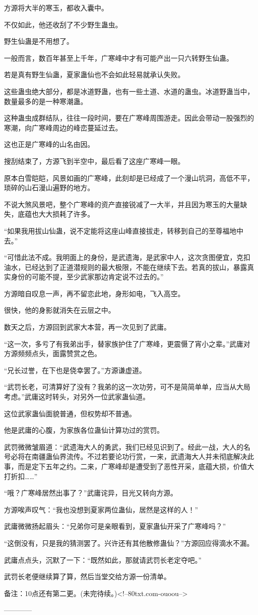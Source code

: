 \begin{this_body}
方源将大半的寒玉，都收入囊中。

不仅如此，他还收刮了不少野生蛊虫。

野生仙蛊是不用想了。

一般而言，数百年甚至上千年，广寒峰中才有可能产出一只六转野生仙蛊。

若是真有野生仙蛊，夏家蛊仙也不会如此轻易就承认失败。

这些蛊虫绝大部分，都是冰道野蛊，也有一些土道、水道的蛊虫。冰道野蛊当中，数量最多的是一种寒潮蛊。

这种蛊虫成群结队，往往一段时间，要在广寒峰周围游走。因此会带动一股强烈的寒潮，向广寒峰周边的峰峦蔓延过去。

这也正是广寒峰的山名由因。

搜刮结束了，方源飞到半空中，最后看了这座广寒峰一眼。

原本白雪皑皑，风景如画的广寒峰，此刻却是已经成了一个漫山坑洞，高低不平，琐碎的山石漫山遍野的地方。

不说大煞风景吧，整个广寒峰的资产直接锐减了一大半，并且因为寒玉的大量缺失，底蕴也大大损耗了许多。

“如果我用拔山仙蛊，说不定能将这座山峰直接拔走，转移到自己的至尊福地中去。”

“可惜此法不成。我明面上的身份，是武遗海，是武家中人，这次贪图便宜，克扣油水，已经达到了正道潜规则的最大极限，不能在继续下去。若真的拔山，暴露真实身份的可能不提，至少武家那边肯定说不过去的。”

方源暗自叹息一声，再不留恋此地，身形如电，飞入高空。

很快，他的身影就消失在云层之中。

数天之后，方源回到武家大本营，再一次见到了武庸。

“这一次，多亏了有我弟出手，替家族护住了广寒峰，更震慑了宵小之辈。”武庸对方源频频点头，面露赞赏之色。

“兄长过誉，在下也是侥幸罢了。”方源谦虚道。

“武罚长老，可清算好了没有？我弟的这一次功劳，可不是简简单单，应当从大局考虑。”武庸这时转头，对另外一位武家蛊仙道。

这位武家蛊仙面貌普通，但权势却不普通。

他是武庸的心腹，为家族各位蛊仙计算功过的赏罚。

武罚微微皱眉道：“武遗海大人的勇武，我们已经见识到了。经此一战，大人的名号必将在南疆蛊仙界流传。不过若要论功行赏，一来，武遗海大人并未彻底解决此事，而是定下五年之约。二来，广寒峰却是遭受到了恶性开采，底蕴大损，价值大打折扣……”

“哦？广寒峰居然出事了？”武庸诧异，目光又转向方源。

方源唉声叹气：“我也没想到夏家两位蛊仙，居然是这样的人！”

武庸微微扬起眉头：“兄弟你可是亲眼看到，夏家蛊仙开采了广寒峰吗？”

“这倒没有，只是我的猜测罢了。兴许还有其他散修蛊仙？”方源回应得滴水不漏。

武庸点点头，沉默了一下：“既然如此，那就请武罚长老定夺吧。”

武罚长老便继续算了算，然后当堂交给方源一份清单。

备注：10点还有第二更。(未完待续。)<!--80txt.com-ouoou-->

------------

\end{this_body}


